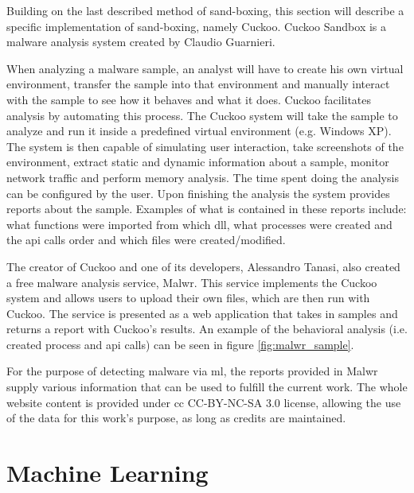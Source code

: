 Building on the last described method of sand-boxing, this section will describe a specific implementation of sand-boxing, namely Cuckoo. Cuckoo Sandbox is a malware analysis system created by Claudio Guarnieri\cite{tool:cuckoo}.

When analyzing a malware sample, an analyst will have to create his own virtual environment, transfer the sample into that environment and manually interact with the sample to see how it behaves and what it does. Cuckoo facilitates analysis by automating this process. The Cuckoo system will take the sample to analyze and run it inside a predefined virtual environment (e.g. Windows XP). The system is then capable of simulating user interaction, take screenshots of the environment, extract static and dynamic information about a sample, monitor network traffic and perform memory analysis. The time spent doing the analysis can be configured by the user. Upon finishing the analysis the system provides reports about the sample. Examples of what is contained in these reports include: what functions were imported from which \gls{dll}, what processes were created and the \gls{api} calls order and which files were created/modified.

The creator of Cuckoo and one of its developers, Alessandro Tanasi, also created a free malware analysis service, Malwr\cite{tool:malwr}. This service implements the Cuckoo system and allows users to upload their own files, which are then run with Cuckoo. The service is presented as a web application that takes in samples and returns a report with Cuckoo's results. An example of the behavioral analysis (i.e. created process and \gls{api} calls) can be seen in figure \ref{fig:malwr_sample}.


For the purpose of detecting malware via \gls{ml}, the reports provided in Malwr supply various information that can be used to fulfill the current work. The whole website content is provided under \gls{cc} CC-BY-NC-SA 3.0\cite{cc-by-nc-sa} license, allowing the use of the data for this work's purpose, as long as credits are maintained.

\section{Machine Learning}
\label{section:ml}

